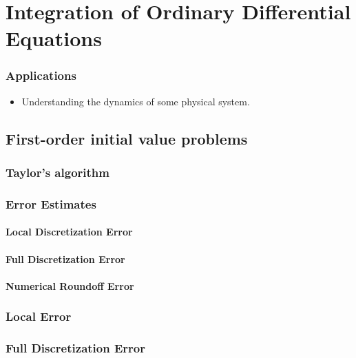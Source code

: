 \chapter{Integration of Ordinary Differential Equations}

\subsection*{Applications}

\begin{itemize}
    \item Understanding the dynamics of some physical system.
\end{itemize}

\section{First-order initial value problems}

\subsection{Taylor's algorithm}

\subsection{Error Estimates}

\subsubsection{Local Discretization Error}

\subsubsection{Full Discretization Error}

\subsubsection{Numerical Roundoff Error}

\subsection{Local Error}

\subsection{Full Discretization Error}

